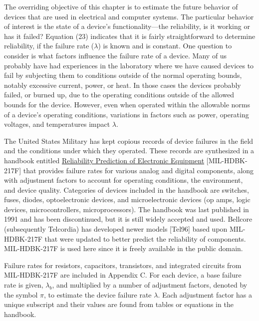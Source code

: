 {The overriding objective of this chapter is to estimate the future
behavior of devices that are used in electrical and computer systems.
The particular behavior of interest is the state of a device's
functionality---the reliability, is it working or has it failed?
Equation (23) indicates that it is fairly straightforward to determine
reliability, if the failure rate ($\lambda$) is known and is constant.
One question to consider is what factors influence the failure rate of a
device. Many of us probably have had experiences in the laboratory where
we have caused devices to fail by subjecting them to conditions outside
of the normal operating bounds, notably excessive current, power, or
heat. In those cases the devices probably failed, or burned up, due to
the operating conditions outside of the allowed bounds for the device.
However, even when operated within the allowable norms of a device's
operating conditions, variations in factors such as power, operating
voltages, and temperatures impact $\lambda$.

The United States Military has kept copious records of device failures
in the field and the conditions under which they operated. These records
are synthesized in a handbook entitled \ul{Reliability Prediction of
Electronic Equipment} {[}MIL-HDBK-217F{]} that provides failure rates
for various analog and digital components, along with adjustment factors
to account for operating conditions, the environment, and device
quality. Categories of devices included in the handbook are switches,
fuses, diodes, optoelectronic devices, and microelectronic devices (op
amps, logic devices, microcontrollers, microprocessors). The handbook
was last published in 1991 and has been discontinued, but it is still
widely accepted and used. Bellcore (subsequently Telcordia) has
developed newer models {[}Tel96{]} based upon MIL-HDBK-217F that were
updated to better predict the reliability of components. MIL-HDBK-217F
is used here since it is freely available in the public domain.

Failure rates for resistors, capacitors, transistors, and integrated
circuits from MIL-HDBK-217F are included in Appendix C. For each device,
a base failure rate is given, $\lambda_b$, and multiplied
by a number of adjustment factors, denoted by the symbol
$\pi$, to estimate the device failure
rate $\lambda$. Each adjustment factor has a unique subscript and their
values are found from tables or equations in the handbook.

}

